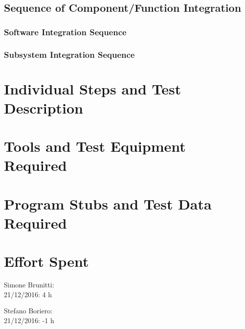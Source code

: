 \documentclass{article}
\begin{document}
\subsection{Sequence of Component/Function Integration}
\subsubsection{Software Integration Sequence}
\subsubsection{Subsystem Integration Sequence}
\newpage
\section{Individual Steps and Test Description}
\newpage
\section{Tools and Test Equipment Required}
\newpage
\section{Program Stubs and Test Data Required}
\newpage
\section{Effort Spent}
Simone Brunitti: \\
21/12/2016: 4 h

Stefano Boriero: \\
21/12/2016: -1 h
\end{document}
